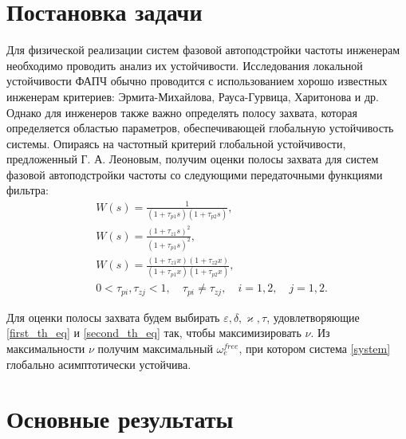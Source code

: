 \documentclass[a4paper,article,14pt]{extarticle}
\begin{document}

\newpage
\section{Постановка задачи}
Для физической реализации систем фазовой автоподстройки частоты инженерам необходимо проводить анализ их устойчивости. Исследования локальной устойчивости ФАПЧ обычно проводится с использованием хорошо известных инженерам критериев: Эрмита-Михайлова, Рауса-Гурвица, Харитонова и др. Однако для инженеров также важно определять полосу захвата, которая определяется областью параметров, обеспечивающей глобальную устойчивость системы. Опираясь на частотный критерий глобальной устойчивости, предложенный Г. А. Леоновым, получим оценки полосы захвата для систем фазовой автоподстройки частоты со следующими передаточными функциями фильтра: 
 \begin{align}
&W(s) = \frac{1}{(1+\tau_{p1}s)(1+\tau_{p2}s)},\\[5pt]
&W(s) = \frac{(1+\tau_{z1}s)^2}{(1+\tau_{p1}s)^2},\\[5pt]
&W(s) = \frac{(1+\tau_{z1}x)(1+\tau_{z2}x)}{(1+\tau_{p1}x)(1+\tau_{p2}x)},\\
&0<\tau_{pi},\tau_{zj} < 1, \quad \tau_{pi} \neq \tau_{zj}, \quad i=1,2, \quad j=1,2.
 \end{align}
 
 Для оценки полосы захвата будем выбирать $\varepsilon, \delta, \varkappa, \tau$, удовлетворяющие \eqref{first_th_eq} и \eqref{second_th_eq} так, чтобы максимизировать $\nu$. Из максимальности $\nu$ получим максимальный $\omega_e^{free}$, при котором система \eqref{system} глобально асимптотически устойчива.
 

\pagebreak
\section{Основные результаты}
\end{document}
